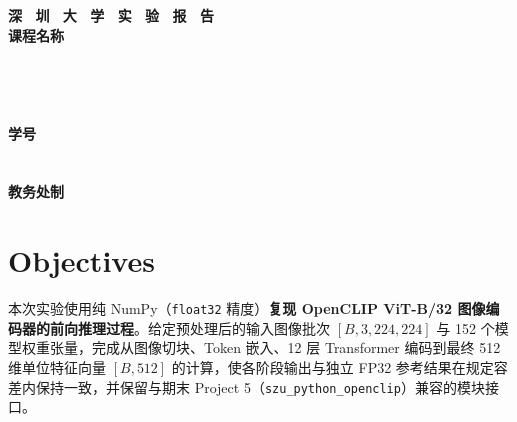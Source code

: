 \documentclass[a4paper,11pt]{article}
\newcommand{\mywork}[1]{\textcolor{myred}{\textbf{#1}}}
\begin{document}
\begin{titlepage}
    \centering
    \vspace*{2cm}
    \Huge{\textbf{深 \ 圳 \ 大 \ 学 \ 实 \ 验  \ 报 \ 告}}\\[1.5cm]
    
    {\Large\textbf{课程名称}\quad\underline{}}\\[0.5cm]
{\Large
\noindent{}
\underline{}}\\[0.5cm]
{\Large
\noindent{}
\underline{}}\\[0.5cm]
{\Large
\noindent{}
\underline{}}\\[0.5cm]
{\Large
\noindent{}
\underline{}}\\[0.5cm]
{\Large
\noindent{}
\underline{}
\hspace{0.5cm}
\textbf{学号}
\underline{}}\\[0.5cm]
{\Large
\noindent{}
\underline{}}\\[0.5cm]
{\Large
\noindent{}
\underline{}}\\[1.5cm]

    \vfill
    \Large{\textbf{教务处制}}
\end{titlepage}



\section{Objectives}

本次实验使用纯 NumPy（\texttt{float32} 精度）\mywork{复现 OpenCLIP ViT-B/32 图像编码器的前向推理过程}。给定预处理后的输入图像批次 $[B,3,224,224]$ 与 152 个模型权重张量，完成从图像切块、Token 嵌入、12 层 Transformer 编码到最终 512 维单位特征向量 $[B,512]$ 的计算，使各阶段输出与独立 FP32 参考结果在规定容差内保持一致，并保留与期末 Project 5（\texttt{szu\_python\_openclip}）兼容的模块接口。
\end{document}
